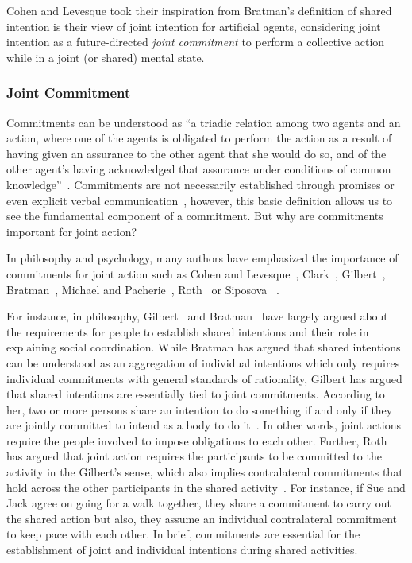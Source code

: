 \documentclass[a4paper,11pt,twoside]{StyleThese}
\begin{document}
Cohen and Levesque took their inspiration from Bratman's definition of shared intention is their view of joint intention for artificial agents, considering joint intention as a future-directed \textit{joint commitment} to perform a collective action while in a joint (or shared) mental state.

\subsubsection{Joint Commitment}
Commitments can be understood as ``a triadic relation among two agents and an action, where one of the agents is obligated to perform the action as a result of having given an assurance to the other agent that she would do so, and of the other agent’s having acknowledged that assurance under conditions of common knowledge''~\cite[p.~756]{michael_2017_commitment}. Commitments are not necessarily established through promises or even explicit verbal communication~\cite{ledyard_1994_public, scanlon_2000_we, siposova_2018_communicative}, however, this basic definition allows us to see the fundamental component of a commitment. But why are commitments important for joint action?

In philosophy and psychology, many authors have emphasized the importance of commitments for joint action such as Cohen and Levesque~\cite{cohen_1991_teamwork}, Clark~\cite{clark_2006_social}, Gilbert~\cite{gilbert_2009_shared}, Bratman~\cite{bratman_2014_shared}, Michael and Pacherie~\cite{michael_2015_commitments}, Roth~\cite{roth_2014_shared} or Siposova \etal~\cite{siposova_2018_communicative}. 

For instance, in philosophy, Gilbert~\cite{gilbert_2009_shared} and Bratman~\cite{bratman_2014_shared} have largely argued about the requirements for people to establish shared intentions and their role in explaining social coordination. While Bratman has argued that shared intentions can be understood as an aggregation of individual intentions which only requires individual commitments with general standards of rationality, Gilbert has argued that shared intentions are essentially tied to joint commitments. According to her, two or more persons share an intention to do something if and only if they are jointly committed to intend as a body to do it~\cite[p.~179]{gilbert_2009_shared}. In other words, joint actions require the people involved to impose obligations to each other. Further, Roth has argued that joint action requires the participants to be committed to the activity in the Gilbert’s sense, which also implies contralateral commitments that hold across the other participants in the shared activity~\cite{roth_2014_shared}. For instance, if Sue and Jack agree on going for a walk together, they share a commitment to carry out the shared action but also, they assume an individual contralateral commitment to keep pace with each other. In brief, commitments are essential for the establishment of joint and individual intentions during shared activities. 
\end{document}
